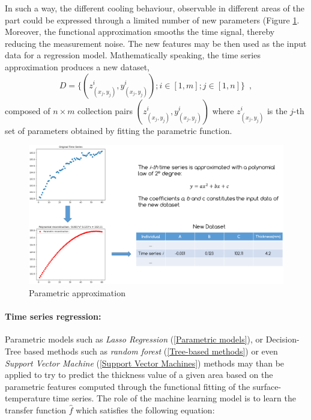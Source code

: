 In such a way, the different cooling behaviour, observable in different areas of the part could be expressed through a limited number of new parameters (Figure \ref{fig:parametric_approximation}. Moreover, the functional approximation smooths the time signal, thereby reducing the measurement noise. The new features may be then used as the input data for a regression model. Mathematically speaking, the time series approximation produces a new dataset,
%
\begin{equation*}
    D = \{(z^{i}_{(x_j, y_j)}, y^{i}_{(x_j, y_j)});i \in [1, m]; j \in [1, n]\}
    \enspace,
\end{equation*}
%
composed of $n\times m$ collection pairs $(z^{i}_{(x_j, y_j)}, y^{i}_{(x_j, y_j)})$ where $z^{i}_{(x_j, y_j)}$ is the $j$-th set of parameters obtained by fitting the parametric function. 

\begin{figure}
\centering
\includegraphics[scale=0.9]{images/chapter_4/Parametric approximation (Polynomial).png}
\caption{Parametric approximation}
\label{fig:parametric_approximation}
\end{figure}

\paragraph{Time series regression:}
Parametric models such as \textit{Lasso Regression} (\ref{Parametric models}), or Decision-Tree based methods such as \textit{random forest} (\ref{Tree-based methods}) or even \textit{Support Vector Machine} (\ref{Support Vector Machines}) methods may than be applied to try to predict the thickness value of a given area based on the parametric features computed through the functional fitting of the surface-temperature time series. The role of the machine learning model is to learn the transfer function $\hat{f}$ which satisfies the following equation:

